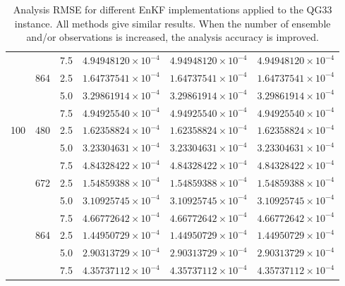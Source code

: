 \documentclass[12pt]{article}
\begin{document}
\begin{table}[H]
{\begin{tabular}{|c|c|c|c|c|c|}
& & 7.5 & $ 4.94948120 \times 10^{-4} $ & $ 4.94948120 \times 10^{-4} $ & $ 4.94948120 \times 10^{-4} $  \\ 
\cline{2-6}
&  \multirow{3}{*}{864}  & 2.5 & $ 1.64737541 \times 10^{-4} $ & $ 1.64737541 \times 10^{-4} $ & $ 1.64737541 \times 10^{-4} $ \\
& & 5.0 & $ 3.29861914 \times 10^{-4} $ & $ 3.29861914 \times 10^{-4} $ & $ 3.29861914 \times 10^{-4} $  \\ 
& & 7.5 & $ 4.94925540 \times 10^{-4} $ & $ 4.94925540 \times 10^{-4} $ & $ 4.94925540 \times 10^{-4} $  \\ 
\cline{1-6}
\multirow{9}{*}{100} &  \multirow{3}{*}{480}  & 2.5 & $1.62358824 \times 10^{-4}$ & $1.62358824 \times 10^{-4} $ & $ 1.62358824 \times 10^{-4} $ \\
& & 5.0 & $ 3.23304631 \times 10^{-4} $ & $ 3.23304631 \times 10^{-4} $ & $ 3.23304631 \times 10^{-4} $  \\ 
& & 7.5 & $ 4.84328422 \times 10^{-4} $ & $ 4.84328422 \times 10^{-4} $ & $ 4.84328422 \times 10^{-4} $  \\ 
\cline{2-6}
&  \multirow{3}{*}{672}  & 2.5 & $ 1.54859388 \times 10^{-4} $ & $ 1.54859388 \times 10^{-4} $ & $ 1.54859388 \times 10^{-4} $ \\
& & 5.0 & $ 3.10925745 \times 10^{-4} $ & $ 3.10925745 \times 10^{-4} $ & $ 3.10925745 \times 10^{-4} $  \\ 
& & 7.5 & $ 4.66772642 \times 10^{-4} $ & $ 4.66772642 \times 10^{-4} $ & $ 4.66772642 \times 10^{-4} $  \\ 
\cline{2-6}
&  \multirow{3}{*}{864}  & 2.5 & $ 1.44950729 \times 10^{-4} $ & $ 1.44950729 \times 10^{-4} $ & $ 1.44950729 \times 10^{-4} $ \\
& & 5.0 & $ 2.90313729 \times 10^{-4} $ & $ 2.90313729 \times 10^{-4} $ & $ 2.90313729 \times 10^{-4} $  \\ 
& & 7.5 & $ 4.35737112 \times 10^{-4} $ & $ 4.35737112 \times 10^{-4} $ & $ 4.35737112 \times 10^{-4} $  \\ 
\hline
\end{tabular}
}
\caption{Analysis RMSE for different EnKF implementations applied to the QG33 instance.
All methods give similar results. When the number of ensemble and/or observations is increased, the analysis accuracy is improved.}
\label{Tab:QG33-Results-RMSE}
\end{table}
\end{document}
